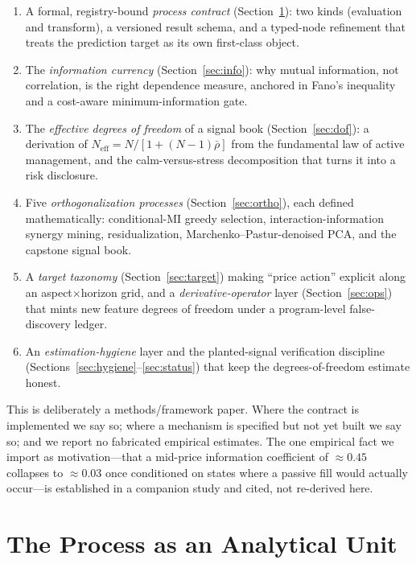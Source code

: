 \documentclass[11pt,a4paper]{article}
\theoremstyle{definition}
\theoremstyle{plain}
\newcommand{\Neff}{N_{\mathrm{eff}}}
\newcommand{\rhobar}{\bar{\rho}}
\begin{document}
\begin{enumerate}
  \item A formal, registry-bound \emph{process contract} (Section~\ref{sec:process}): two kinds
        (evaluation and transform), a versioned result schema, and a typed-node refinement that
        treats the prediction target as its own first-class object.
  \item The \emph{information currency} (Section~\ref{sec:info}): why mutual information, not
        correlation, is the right dependence measure, anchored in Fano's inequality and a
        cost-aware minimum-information gate.
  \item The \emph{effective degrees of freedom} of a signal book (Section~\ref{sec:dof}): a
        derivation of $\Neff = N/[1+(N-1)\rhobar]$ from the fundamental law of active management,
        and the calm-versus-stress decomposition that turns it into a risk disclosure.
  \item Five \emph{orthogonalization processes} (Section~\ref{sec:ortho}), each defined
        mathematically: conditional-MI greedy selection, interaction-information synergy mining,
        residualization, Marchenko--Pastur-denoised PCA, and the capstone signal book.
  \item A \emph{target taxonomy} (Section~\ref{sec:target}) making ``price action'' explicit along
        an aspect$\times$horizon grid, and a \emph{derivative-operator} layer
        (Section~\ref{sec:ops}) that mints new feature degrees of freedom under a program-level
        false-discovery ledger.
  \item An \emph{estimation-hygiene} layer and the planted-signal verification discipline
        (Sections~\ref{sec:hygiene}--\ref{sec:status}) that keep the degrees-of-freedom estimate
        honest.
\end{enumerate}

This is deliberately a methods/framework paper. Where the contract is implemented we say so; where a
mechanism is specified but not yet built we say so; and we report no fabricated empirical estimates.
The one empirical fact we import as motivation---that a mid-price information coefficient of
$\approx 0.45$ collapses to $\approx 0.03$ once conditioned on states where a passive fill would
actually occur---is established in a companion study and cited, not re-derived here.

\section{The Process as an Analytical Unit}
\label{sec:process}
\end{document}

